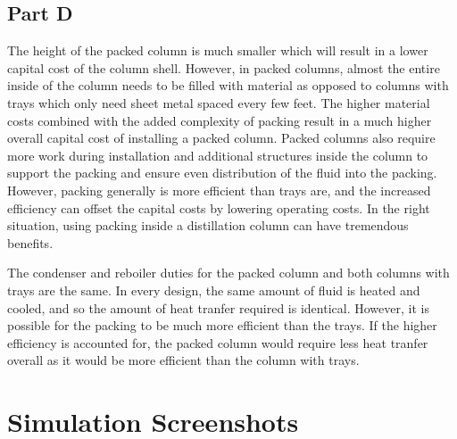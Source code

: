 \documentclass[12pt]{article}
\begin{document}
\subsection{Part D}
The height of the packed column is much smaller which will result in a lower capital cost of the column shell. However, in packed columns, almost the entire inside of the column needs to be filled with material as opposed to columns with trays which only need sheet metal spaced every few feet. The higher material costs combined with the added complexity of packing result in a much higher overall capital cost of installing a packed column. Packed columns also require more work during installation and additional structures inside the column to support the packing and ensure even distribution of the fluid into the packing. However, packing generally is more efficient than trays are, and the increased efficiency can offset the capital costs by lowering operating costs. In the right situation, using packing inside a distillation column can have tremendous benefits.

The condenser and reboiler duties for the packed column and both columns with trays are the same. In every design, the same amount of fluid is heated and cooled, and so the amount of heat tranfer required is identical. However, it is possible for the packing to be much more efficient than the trays. If the higher efficiency is accounted for, the packed column would require less heat tranfer overall as it would be more efficient than the column with trays.



\section{Simulation Screenshots}
\end{document}

